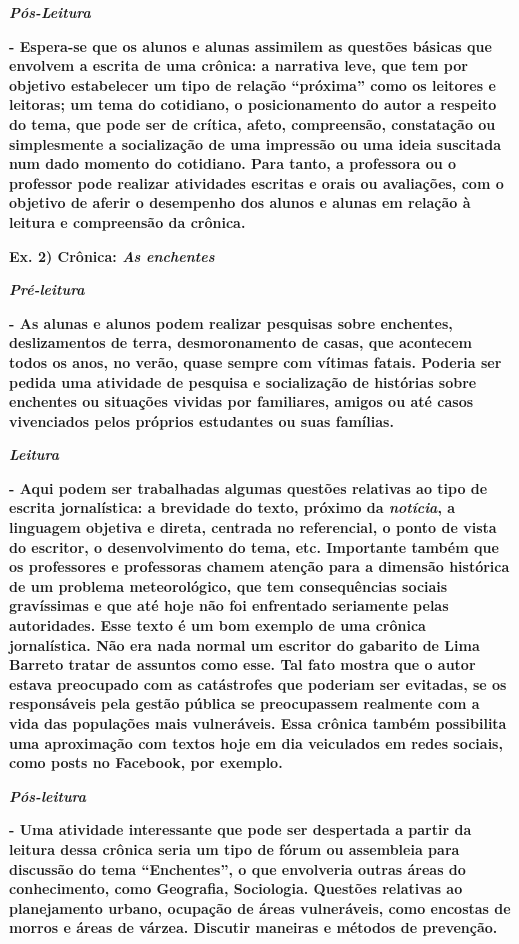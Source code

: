 \emph{\textbf{Pós-Leitura }}

\textbf{- Espera-se que os alunos e alunas assimilem as questões básicas
que envolvem a escrita de uma crônica: a narrativa leve, que tem por
objetivo estabelecer um tipo de relação ``próxima'' como os leitores e
leitoras; um tema do cotidiano, o posicionamento do autor a respeito do
tema, que pode ser de crítica, afeto, compreensão, constatação ou
simplesmente a socialização de uma impressão ou uma ideia suscitada num
dado momento do cotidiano. Para tanto, a professora ou o professor pode
realizar atividades escritas e orais ou avaliações, com o objetivo de
aferir o desempenho dos alunos e alunas em relação à leitura e
compreensão da crônica. }

\textbf{Ex. 2) Crônica: \emph{As enchentes}}

\emph{\textbf{Pré-leitura}}

\textbf{- As alunas e alunos podem realizar pesquisas sobre enchentes,
deslizamentos de terra, desmoronamento de casas, que acontecem todos os
anos, no verão, quase sempre com vítimas fatais. Poderia ser pedida uma
atividade de pesquisa e socialização de histórias sobre enchentes ou
situações vividas por familiares, amigos ou até casos vivenciados pelos
próprios estudantes ou suas famílias. }

\emph{\textbf{Leitura}}

\textbf{- Aqui podem ser trabalhadas algumas questões relativas ao tipo
de escrita jornalística: a brevidade do texto, próximo da
\emph{notícia}, a linguagem objetiva e direta, centrada no referencial,
o ponto de vista do escritor, o desenvolvimento do tema, etc. Importante
também que os professores e professoras chamem atenção para a dimensão
histórica de um problema meteorológico, que tem consequências sociais
gravíssimas e que até hoje não foi enfrentado seriamente pelas
autoridades. Esse texto é um bom exemplo de uma crônica jornalística.
Não era nada normal um escritor do gabarito de Lima Barreto tratar de
assuntos como esse. Tal fato mostra que o autor estava preocupado com as
catástrofes que poderiam ser evitadas, se os responsáveis pela gestão
pública se preocupassem realmente com a vida das populações mais
vulneráveis. Essa crônica também possibilita uma aproximação com textos
hoje em dia veiculados em redes sociais, como posts no Facebook, por
exemplo. }

\emph{\textbf{Pós-leitura}}

\textbf{- Uma atividade interessante que pode ser despertada a partir da
leitura dessa crônica seria um tipo de fórum ou assembleia para
discussão do tema ``Enchentes'', o que envolveria outras áreas do
conhecimento, como Geografia, Sociologia. Questões relativas ao
planejamento urbano, ocupação de áreas vulneráveis, como encostas de
morros e áreas de várzea. Discutir maneiras e métodos de prevenção.}

